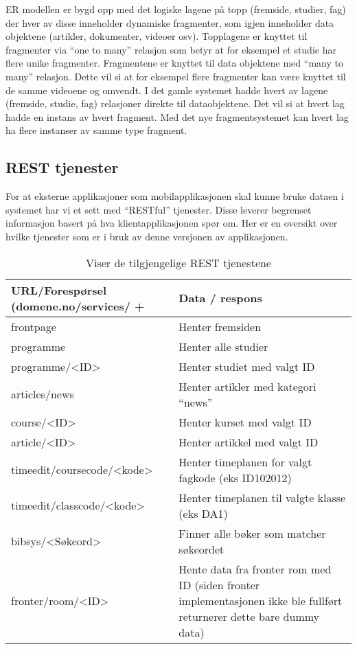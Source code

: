 \documentclass[../main.tex]{subfiles}
\begin{document}
ER modellen er bygd opp med det logiske lagene på topp (fremside, studier, fag) der hver av disse inneholder dynamiske fragmenter, som igjen inneholder data objektene (artikler, dokumenter, videoer osv). Topplagene er knyttet til fragmenter via “one to many” relasjon som betyr at for eksempel et studie har flere unike fragmenter. Fragmentene er knyttet til data objektene med “many to many” relasjon. Dette vil si at for eksempel flere fragmenter kan være knyttet til de samme videoene og omvendt.\newline
\newline
I det gamle systemet hadde hvert av lagene (fremside, studie, fag) relasjoner direkte til dataobjektene. Det vil si at hvert lag hadde en instans av hvert fragment. Med det nye fragmentsystemet kan hvert lag ha flere instanser av samme type fragment.

\subsection{REST tjenester}

For at eksterne applikasjoner som mobilapplikasjonen skal kunne bruke dataen i systemet har vi et sett med “RESTful” tjenester. Disse leverer begrenset informasjon basert på hva klientapplikasjonen spør om. Her er en oversikt over hvilke tjenester som er i bruk av denne versjonen av applikasjonen.

\begin{table}[H]
\begin{center}
\caption{Viser de tilgjengelige REST tjenestene}
  \begin{tabular}{ | p{5cm} | p{8cm} |}
    \hline
    URL/Forespørsel (domene.no/services/ + & Data / respons \\ \hline
    frontpage & Henter fremsiden \\ \hline
    programme & Henter alle studier \\ \hline
    programme/<ID> & Henter studiet med valgt ID \\ \hline
    articles/news & Henter artikler med kategori “news” \\ \hline
    course/<ID> & Henter kurset med valgt ID \\ \hline
    article/<ID> & Henter artikkel med valgt ID \\ \hline
    timeedit/coursecode/<kode> & Henter timeplanen for valgt fagkode (eks ID102012) \\ \hline
    timeedit/classcode/<kode> & Henter timeplanen til valgte klasse (eks DA1) \\ \hline
    bibsys/<Søkeord> & Finner alle bøker som matcher søkeordet \\ \hline
    fronter/room/<ID> & Hente data fra fronter rom med ID (siden fronter implementasjonen ikke ble fullført returnerer dette bare dummy data) \\
    \hline
  \end{tabular}
\end{center}
\end{table}
\end{document}
